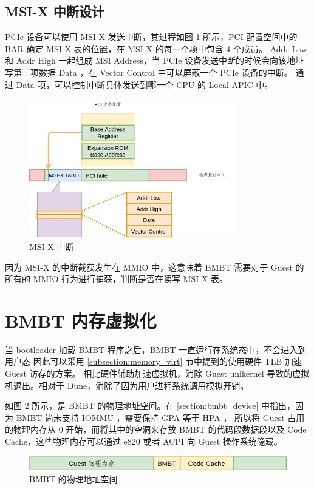 \subsection{MSI-X 中断设计}
PCIe 设备可以使用 MSI-X 发送中断，其过程如图 \ref{fig:msix} 所示，PCI 配置空间中的 BAR 确定 MSI-X 表的位置，在 MSI-X 的每一个项中包含 4 个成员。
Addr Low 和 Addr High 一起组成 MSI Address，当 PCIe 设备发送中断的时候会向该地址写第三项数据 Data ，在 Vector Control 中可以屏蔽一个 PCIe 设备的中断。
通过 Data 项，可以控制中断具体发送到哪一个 CPU 的 Local APIC 中。

\begin{figure}[!htbp]
	\centering
	\includegraphics[width=0.8\textwidth]{./images/MSI-X.jpg}
	\caption{MSI-X 中断}
	\label{fig:msix}
\end{figure}

因为 MSI-X 的中断截获发生在 MMIO 中，这意味着 BMBT 需要对于 Guest 的所有的 MMIO 行为进行捕获，判断是否在读写 MSI-X 表。

\section{BMBT 内存虚拟化}
当 bootloader 加载 BMBT 程序之后，BMBT 一直运行在系统态中，不会进入到用户态
因此可以采用 \ref{subsection:memory_virt} 节中提到的使用硬件 TLB 加速 Guest 访存的方案。
相比硬件辅助加速虚拟机，消除 Guest unikernel 导致的虚拟机退出。相对于 Dune，消除了因为用户进程系统调用模拟开销。

如图 \ref{fig:bmbt-layout} 所示，是 BMBT 的物理地址空间。在 \ref{section:bmbt_device} 中指出，因为 BMBT 尚未支持 IOMMU ，需要保持 GPA 等于 HPA ，
所以将 Guest 占用的物理内存从 0 开始，而将其中的空洞来存放 BMBT 的代码段数据段以及 Code Cache，这些物理内存可以通过 e820 或者 ACPI 向 Guest 操作系统隐藏。

\begin{figure}[!htbp]
	\centering
	\includegraphics[width=1\textwidth]{./images/bmbt-layout.jpg}
	\caption{BMBT 的物理地址空间}
	\label{fig:bmbt-layout}
\end{figure}

